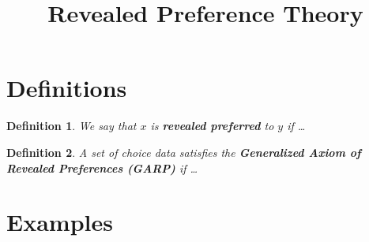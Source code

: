 \documentclass{article} %
\title{Revealed Preference Theory}
\newtheorem{definition}{Definition} %
\begin{document}
	

\maketitle

\section{Definitions}

\begin{definition}
We say that $x$ is \textbf{revealed preferred} to $y$ if \ldots
\end{definition}

\begin{definition}
A set of choice data satisfies the \textbf{Generalized Axiom of Revealed Preferences (GARP)} if \ldots
\end{definition}

\section{Examples}
\end{document}

